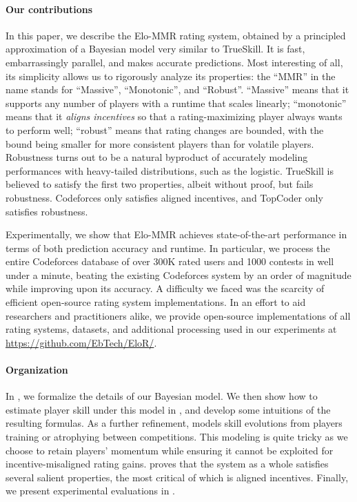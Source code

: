 \paragraph{Our contributions} 
In this paper, we describe the Elo-MMR rating system, obtained by a principled approximation of a Bayesian model very similar to TrueSkill. It is fast, embarrassingly parallel, and makes accurate predictions. Most interesting of all, its simplicity allows us to rigorously analyze its properties: the ``MMR'' in the name stands for ``Massive'', ``Monotonic'', and ``Robust''. ``Massive'' means that it supports any number of players with a runtime that scales linearly; ``monotonic'' means that it \emph{aligns incentives} so that a rating-maximizing player always wants to perform well; ``robust'' means that rating changes are bounded, with the bound being smaller for more consistent players than for volatile players. Robustness turns out to be a natural byproduct of accurately modeling performances with heavy-tailed distributions, such as the logistic. TrueSkill is believed to satisfy the first two properties, albeit without proof, but fails robustness. Codeforces only satisfies aligned incentives, and TopCoder only satisfies robustness.

Experimentally, we show that Elo-MMR achieves state-of-the-art performance in terms of both prediction accuracy and runtime. In particular, we process the entire Codeforces database of over 300K rated users and 1000 contests in well under a minute, beating the existing Codeforces system by an order of magnitude while improving upon its accuracy. A difficulty we faced was the scarcity of efficient open-source rating system implementations. In an effort to aid researchers and practitioners alike, we provide open-source implementations of all rating systems, datasets, and additional processing used in our experiments at \url{https://github.com/EbTech/EloR/}.

\paragraph{Organization}
In , we formalize the details of our Bayesian model. We then show how to estimate player skill under this model in , and develop some intuitions of the resulting formulas. As a further refinement,  models skill evolutions from players training or atrophying between competitions. This modeling is quite tricky as we choose to retain players' momentum while ensuring it cannot be exploited for incentive-misaligned rating gains.  proves that the system as a whole satisfies several salient properties, the most critical of which is aligned incentives. Finally, we present experimental evaluations in .